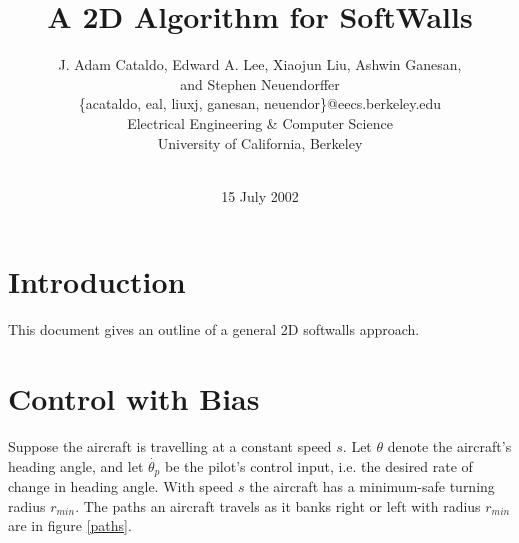 \documentclass[11pt]{article}
\begin{document}


\title{A 2D Algorithm for SoftWalls}

\author{J. Adam Cataldo, Edward A. Lee, Xiaojun Liu, Ashwin Ganesan,\\
and Stephen Neuendorffer\\ 
\{acataldo, eal, liuxj, ganesan, neuendor\}@eecs.berkeley.edu\\
Electrical Engineering \& Computer Science\\ 
University of California, Berkeley\\ 
\\}

\date{15 July 2002}
\maketitle


\section{Introduction}

This document gives an outline of a general 2D softwalls approach.



\section{Control with Bias}


Suppose the aircraft is travelling at a constant speed $s$.  Let
$\theta$ denote the aircraft's heading angle, and let
$\dot{\theta_{p}}$ be the pilot's control input, i.e. the desired rate
of change in heading angle.  With speed $s$ the aircraft has a
minimum-safe turning radius $r_{min}$.  The paths an aircraft travels
as it banks right or left with radius $r_{min}$ are in figure \ref{paths}.
\end{document}
